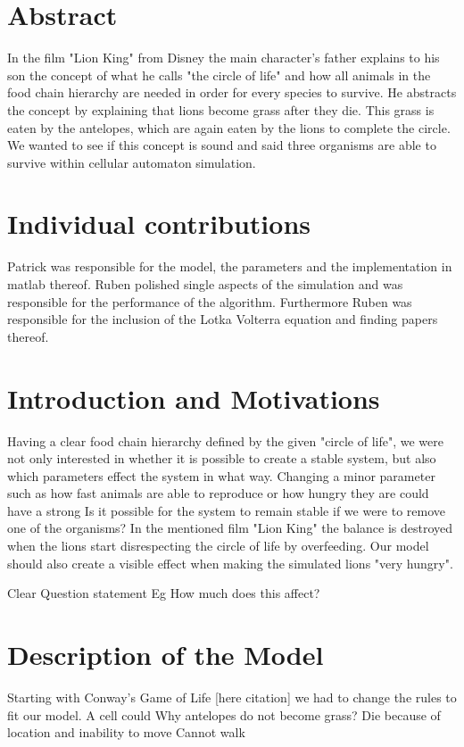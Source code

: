 \documentclass[11pt]{article}
\begin{document}
\section{Abstract}
In the film "Lion King" from Disney the main character's father explains to his son the concept of what he calls "the circle of life" and how all animals in the food chain hierarchy are needed in order for every species to survive. He abstracts the concept by explaining that lions become grass after they die. This grass is eaten by the antelopes, which are again eaten by the lions to complete the circle. We wanted to see if this concept is sound and said three organisms are able to survive within cellular automaton simulation.

\section{Individual contributions}
Patrick was responsible for the model, the parameters and the implementation in matlab thereof. Ruben polished single aspects of the simulation and was responsible for the performance of the algorithm. Furthermore Ruben was responsible for the inclusion of the Lotka Volterra equation and finding papers thereof.

\section{Introduction and Motivations}
Having a clear food chain hierarchy defined by the given "circle of life", we were not only interested in whether it is possible to create a stable system, but also which parameters effect the system in what way. Changing a minor parameter such as how fast animals are able to reproduce or how hungry they are could have a strong Is it possible for the system to remain stable if we were to remove one of the organisms? In the mentioned film "Lion King" the balance is destroyed when the lions start disrespecting the circle of life by overfeeding. Our model should also create a visible effect when making the simulated lions "very hungry".


Clear Question statement
Eg How much does this affect?

\section{Description of the Model}
Starting with Conway's Game of Life [here citation] we had to change the rules to fit our model. A cell could
Why antelopes do not become grass?
Die because of location and inability to move
Cannot walk
\end{document}
